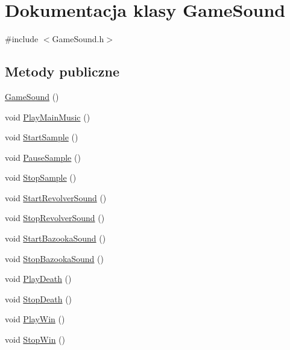 \hypertarget{class_game_sound}{}\section{Dokumentacja klasy Game\+Sound}
\label{class_game_sound}


{\ttfamily \#include $<$Game\+Sound.\+h$>$}

\subsection*{Metody publiczne}
\begin{DoxyCompactItemize}
\item 
\mbox{\hyperlink{class_game_sound_a14feacd320c8a89e68cacf456920c8c1}{Game\+Sound}} ()
\item 
void \mbox{\hyperlink{class_game_sound_ad89f0cfad75194e895cb68437f9c231f}{Play\+Main\+Music}} ()
\item 
void \mbox{\hyperlink{class_game_sound_a30db244babc1e4aa518bd56500cea028}{Start\+Sample}} ()
\item 
void \mbox{\hyperlink{class_game_sound_a9b64e35e47dd7f06876be460c9cbf67f}{Pause\+Sample}} ()
\item 
void \mbox{\hyperlink{class_game_sound_a819246ab2ca8154f7b8fa1b87cdd68ca}{Stop\+Sample}} ()
\item 
void \mbox{\hyperlink{class_game_sound_a909e0c0bc44437ea2853e734ab548e5a}{Start\+Revolver\+Sound}} ()
\item 
void \mbox{\hyperlink{class_game_sound_a88651691b6b8e28f14e73778805bd898}{Stop\+Revolver\+Sound}} ()
\item 
void \mbox{\hyperlink{class_game_sound_ab3bc96f5be15c7a9be79a035ec16638c}{Start\+Bazooka\+Sound}} ()
\item 
void \mbox{\hyperlink{class_game_sound_a90742af83bd0006dba5e9a5129214c9a}{Stop\+Bazooka\+Sound}} ()
\item 
void \mbox{\hyperlink{class_game_sound_acd0ef105f4731da50afe47b3e02558a2}{Play\+Death}} ()
\item 
void \mbox{\hyperlink{class_game_sound_accb7034b9c796bc9270fc3a724d18821}{Stop\+Death}} ()
\item 
void \mbox{\hyperlink{class_game_sound_a429befa039bfc4e9f7b33326fbb090a4}{Play\+Win}} ()
\item 
void \mbox{\hyperlink{class_game_sound_a1001607a8791e3000aff36fcc2d949f3}{Stop\+Win}} ()
\end{DoxyCompactItemize}


